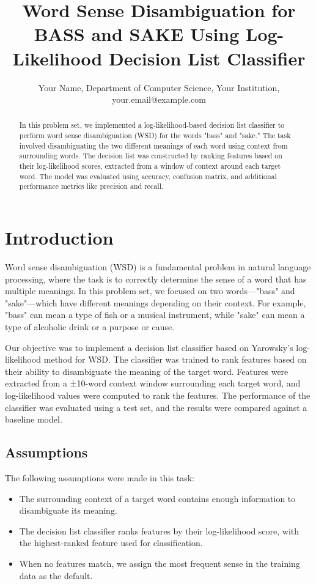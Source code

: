 \documentclass[journal,onecolumn]{IEEEtran}
\title{Word Sense Disambiguation for BASS and SAKE Using Log-Likelihood Decision List Classifier}
\author{Your Name, Department of Computer Science, Your Institution, your.email@example.com}
\begin{document}
\maketitle

\begin{abstract}
In this problem set, we implemented a log-likelihood-based decision list classifier to perform word sense disambiguation (WSD) for the words "bass" and "sake." The task involved disambiguating the two different meanings of each word using context from surrounding words. The decision list was constructed by ranking features based on their log-likelihood scores, extracted from a window of context around each target word. The model was evaluated using accuracy, confusion matrix, and additional performance metrics like precision and recall.
\end{abstract}

\section{Introduction}
Word sense disambiguation (WSD) is a fundamental problem in natural language processing, where the task is to correctly determine the sense of a word that has multiple meanings. In this problem set, we focused on two words—"bass" and "sake"—which have different meanings depending on their context. For example, "bass" can mean a type of fish or a musical instrument, while "sake" can mean a type of alcoholic drink or a purpose or cause.

Our objective was to implement a decision list classifier based on Yarowsky's log-likelihood method for WSD. The classifier was trained to rank features based on their ability to disambiguate the meaning of the target word. Features were extracted from a ±10-word context window surrounding each target word, and log-likelihood values were computed to rank the features. The performance of the classifier was evaluated using a test set, and the results were compared against a baseline model.

\subsection{Assumptions}
The following assumptions were made in this task:
\begin{itemize}
    \item The surrounding context of a target word contains enough information to disambiguate its meaning.
    \item The decision list classifier ranks features by their log-likelihood score, with the highest-ranked feature used for classification.
    \item When no features match, we assign the most frequent sense in the training data as the default.
\end{itemize}
\end{document}
